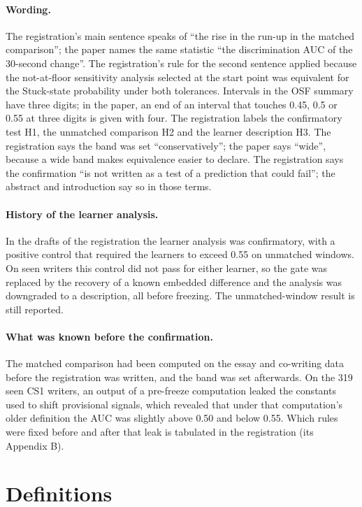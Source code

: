 \paragraph{Wording.} The registration's main sentence speaks of ``the rise in the run-up in the matched comparison'';
the paper names the same statistic ``the discrimination AUC of the 30-second change''. The registration's rule for the
second sentence applied because the not-at-floor sensitivity analysis selected at the start point was equivalent for
the Stuck-state probability under both tolerances. Intervals in the OSF summary have three digits; in the paper, an end
of an interval that touches 0.45, 0.5 or 0.55 at three digits is given with four. The registration labels the
confirmatory test H1, the unmatched comparison H2 and the learner description H3. The registration says the band was set
``conservatively''; the paper says ``wide'', because a wide band makes equivalence easier to declare. The registration
says the confirmation ``is not written as a test of a prediction that could fail''; the abstract and introduction say
so in those terms.

\paragraph{History of the learner analysis.} In the drafts of the registration the learner analysis was confirmatory,
with a positive control that required the learners to exceed 0.55 on unmatched windows. On seen writers this control
did not pass for either learner, so the gate was replaced by the recovery of a known embedded difference and the
analysis was downgraded to a description, all before freezing. The unmatched-window result is still reported.

\paragraph{What was known before the confirmation.} The matched comparison had been computed on the essay and co-writing
data before the registration was written, and the band was set afterwards. On the 319 seen CS1 writers, an output of a
pre-freeze computation leaked the constants used to shift provisional signals, which revealed that under that
computation's older definition the AUC was slightly above 0.50 and below 0.55. Which rules were fixed before and after
that leak is tabulated in the registration (its Appendix B).

\section{Definitions}
\label{app:definitions}

